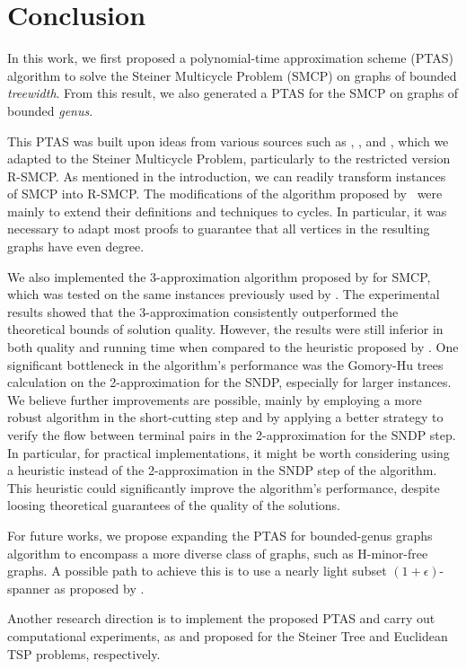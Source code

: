 \chapter{Conclusion}
\label{chapter:conclusion}

In this work, we first proposed a polynomial-time approximation scheme (PTAS) algorithm to solve the Steiner Multicycle Problem (SMCP) on graphs of bounded \textit{treewidth}. From this result, we also generated a PTAS for the SMCP on graphs of bounded \textit{genus}.

This PTAS was built upon ideas from various sources such as \cite{Borradaile2009b}, \cite{Borradaile2012}, and \cite{Bateni}, which we adapted to the Steiner Multicycle Problem, particularly to the restricted version R-SMCP. 
As mentioned in the introduction, we can readily transform instances of SMCP into R-SMCP.
The modifications of the algorithm proposed by~\citeauthor{Bateni} were mainly to extend their definitions and techniques to cycles. 
In particular, it was necessary to adapt most proofs to guarantee that all vertices in the resulting graphs have even degree.   

We also implemented the 3-approximation algorithm proposed by \cite{smcp_3apx} for SMCP, which was tested on the same instances previously used by \cite{Pereira2018TheSM}. 
The experimental results showed that the 3-approximation consistently outperformed the theoretical bounds of solution quality. However, the results were still inferior in both quality and running time when compared to the heuristic proposed by \cite{Pereira2018TheSM}.
One significant bottleneck in the algorithm's performance was the Gomory-Hu trees calculation on the 2-approximation for the SNDP, especially for larger instances.
We believe further improvements are possible, mainly by employing a more robust algorithm in the short-cutting step and by applying a better strategy to verify the flow between terminal pairs in the 2-approximation for the SNDP step.
In particular, for practical implementations, it might be worth considering using a heuristic instead of the 2-approximation in the SNDP step of the algorithm. This heuristic could significantly improve the algorithm's performance, despite loosing theoretical guarantees of the quality of the solutions.

For future works, we propose expanding the PTAS for bounded-genus graphs algorithm to encompass a more diverse class of graphs, such as H-minor-free graphs. A possible path to achieve this is to use a nearly light subset \((1 + \epsilon)\)-spanner as proposed by \cite{light_spanners_tsp}.

Another research direction is to implement the proposed PTAS and carry out computational experiments, as \cite{TazariLargeConstants} and \cite{implementationPTASeuclidianTSP} proposed for the Steiner Tree and Euclidean TSP problems, respectively.
